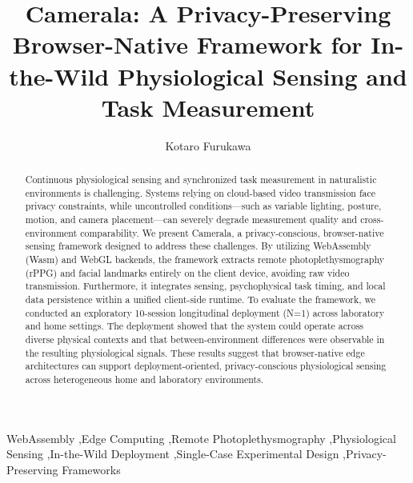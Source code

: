 \documentclass[final,3p,times,twocolumn]{elsarticle}
\begin{document}
\begin{frontmatter}

\title{Camerala: A Privacy-Preserving Browser-Native Framework for In-the-Wild Physiological Sensing and Task Measurement}

\author[a]{Kotaro Furukawa}

\address[a]{College of Transdisciplinary Sciences for Innovation, Kanazawa University, Kanazawa, Ishikawa 920-1192, Japan}

\begin{abstract}
Continuous physiological sensing and synchronized task measurement in naturalistic environments is challenging. Systems relying on cloud-based video transmission face privacy constraints, while uncontrolled conditions—such as variable lighting, posture, motion, and camera placement—can severely degrade measurement quality and cross-environment comparability. We present Camerala, a privacy-conscious, browser-native sensing framework designed to address these challenges. By utilizing WebAssembly (Wasm) and WebGL backends, the framework extracts remote photoplethysmography (rPPG) and facial landmarks entirely on the client device, avoiding raw video transmission. Furthermore, it integrates sensing, psychophysical task timing, and local data persistence within a unified client-side runtime. To evaluate the framework, we conducted an exploratory 10-session longitudinal deployment (N=1) across laboratory and home settings. The deployment showed that the system could operate across diverse physical contexts and that between-environment differences were observable in the resulting physiological signals. These results suggest that browser-native edge architectures can support deployment-oriented, privacy-conscious physiological sensing across heterogeneous home and laboratory environments.
\end{abstract}

\begin{keyword}
WebAssembly \sep Edge Computing \sep Remote Photoplethysmography \sep Physiological Sensing \sep In-the-Wild Deployment \sep Single-Case Experimental Design \sep Privacy-Preserving Frameworks
\end{keyword}

\end{frontmatter}

\end{document}
